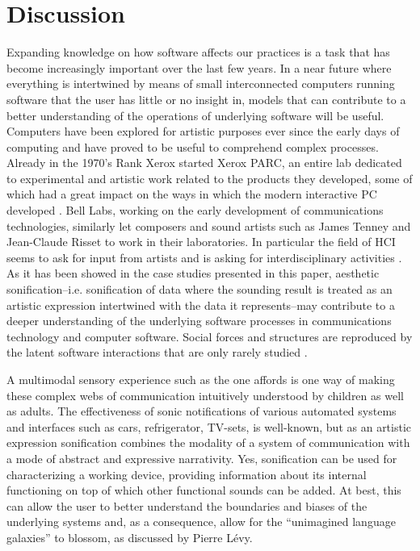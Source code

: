 \documentclass[manuscript,screen]{acmart}
\begin{document}
\section{Discussion}
Expanding knowledge on how software affects our practices is a task that has become increasingly important over the last few years. In a near future where everything is intertwined by means of small interconnected computers running software that the user has little or no insight in, models that can contribute to a better understanding of the operations of underlying software will be useful. Computers have been explored for artistic purposes ever since the early days of computing and have proved to be useful to comprehend complex processes. Already in the 1970's Rank Xerox started Xerox PARC, an entire lab dedicated to experimental and artistic work related to the products they developed, some of which had a great impact on the ways in which the modern interactive PC developed \cite{johnson97}. Bell Labs, working on the early development of communications technologies, similarly let composers and sound artists such as James Tenney and Jean-Claude Risset to work in their laboratories. In particular the field of HCI seems to ask for input from artists and is asking for interdisciplinary activities \cite{thomassen03}. As it has been showed in the case studies presented in this paper, aesthetic sonification--i.e. sonification of data where the sounding result is treated as an artistic expression intertwined with the data it represents--may contribute to a deeper understanding of the underlying software processes in communications technology and computer software. Social forces and structures are reproduced by the latent software interactions that are only rarely studied \cite{engestrom96}.

A multimodal sensory experience such as the one \Pellow affords is one way of making these complex webs of communication intuitively understood by children as well as adults. The effectiveness of sonic notifications of various automated systems and interfaces such as cars, refrigerator, TV-sets, is well-known, but as an artistic expression sonification combines the modality of a system of communication with a mode of abstract and expressive narrativity. Yes, sonification can be used for characterizing a working device, providing information about its internal functioning on top of which other functional sounds can be added. At best, this can allow the user to better understand the boundaries and biases of the underlying systems and, as a consequence, allow for the ``unimagined language galaxies'' to blossom, as discussed by Pierre Lévy\cite{levy97,frisk08phd}.
\end{document}

